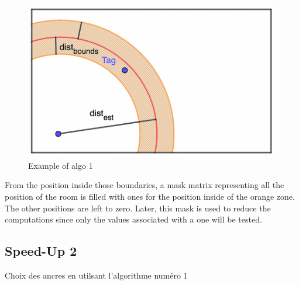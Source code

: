 \begin{figure}[H]
\centering
\includegraphics[width=.65\linewidth]{Images/algo_1.png}
\caption{Example of algo 1}
\label{fig:speedup_1}
\end{figure}

From the position inside those boundaries, a mask matrix representing all the position of the room is filled with ones for the position inside of the orange zone. The other positions are left to zero. Later, this mask is used to reduce the computations since only the values associated with a one will be tested.

\subsection{Speed-Up 2}

Choix des ancres en utilsant l'algorithme numéro 1


